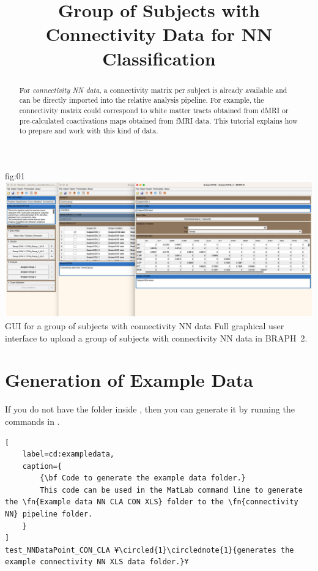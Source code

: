 \documentclass[justified]{tufte-handout}
\title{Group of Subjects with Connectivity Data for NN Classification}
\begin{document}
\maketitle

\begin{abstract}
\noindent
For \emph{connectivity NN data}, a connectivity matrix per subject is already available and can be directly imported into the relative analysis pipeline. For example, the connectivity matrix could correspond to white matter tracts obtained from dMRI or pre-calculated coactivations maps obtained from fMRI data.
This tutorial explains how to prepare and work with this kind of data.
\end{abstract}


\tableofcontents

	{fig:01}
	{\includegraphics{fig01.jpg}}
	{GUI for a group of subjects with connectivity NN data}
	{
	Full graphical user interface to upload a group of subjects with connectivity NN data in BRAPH~2. 
	}

\clearpage
\section{Generation of Example Data}

If you do not have the  folder inside , then you can generate it by running the commands in .

\begin{lstlisting}[
	label=cd:exampledata,
	caption={
		{\bf Code to generate the example data folder.}
		This code can be used in the MatLab command line to generate the \fn{Example data NN CLA CON XLS} folder to the \fn{connectivity NN} pipeline folder.
	}
]
test_NNDataPoint_CON_CLA ¥\circled{1}\circlednote{1}{generates the example connectivity NN XLS data folder.}¥
\end{lstlisting}
\end{document}
